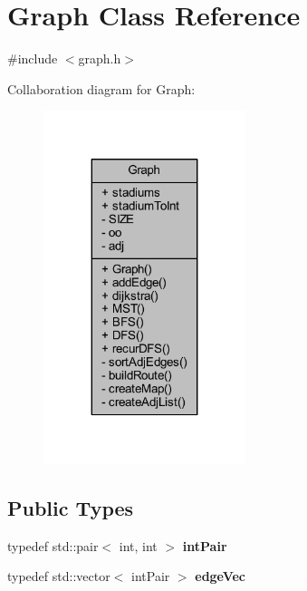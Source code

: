 \hypertarget{class_graph}{}\section{Graph Class Reference}
\label{class_graph}


{\ttfamily \#include $<$graph.\+h$>$}



Collaboration diagram for Graph\+:
\nopagebreak
\begin{figure}[H]
\begin{center}
\leavevmode
\includegraphics[width=167pt]{class_graph__coll__graph}
\end{center}
\end{figure}
\subsection*{Public Types}
\begin{DoxyCompactItemize}
\item 
\mbox{\label{class_graph_a312cc4a3709948724eaf91daf6e6a26b}} 
typedef std\+::pair$<$ int, int $>$ {\bfseries int\+Pair}
\item 
\mbox{\label{class_graph_acd347d927aa7a1e732e68e1268ba329e}} 
typedef std\+::vector$<$ int\+Pair $>$ {\bfseries edge\+Vec}
\end{DoxyCompactItemize}
